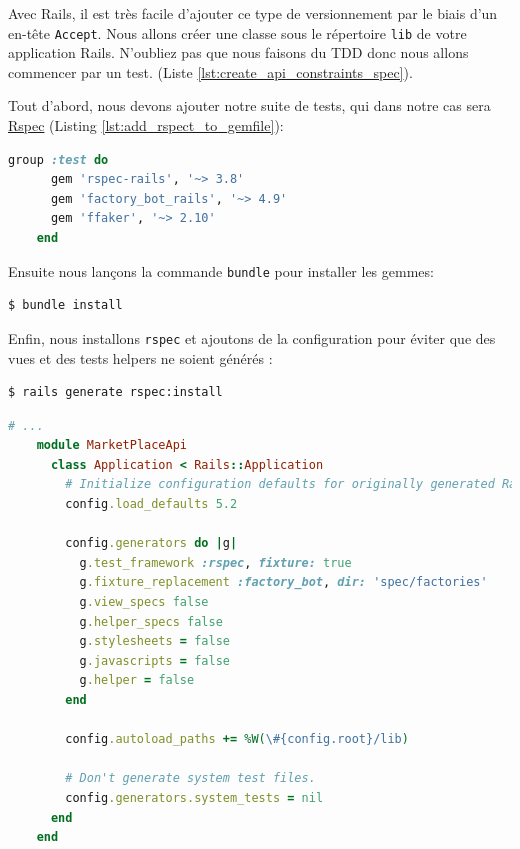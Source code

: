 \documentclass[]{report}
\begin{document}
    Avec Rails, il est très facile d'ajouter ce type de versionnement par le biais d'un en-tête \verb|Accept|. Nous allons créer une classe sous le répertoire \verb|lib| de votre application Rails. N'oubliez pas que nous faisons du TDD donc nous allons commencer par un test. (Liste \ref{lst:create_api_constraints_spec}).

    Tout d'abord, nous devons ajouter notre suite de tests, qui dans notre cas sera \href{http://rspec.info/}{Rspec} (Listing \ref{lst:add_rspect_to_gemfile}):

    \begin{scriptsize}
    \begin{lstlisting}[language=ruby, caption={Gemfile avec la suite de test}, label={lst:add_rspect_to_gemfile}]
    group :test do
      gem 'rspec-rails', '~> 3.8'
      gem 'factory_bot_rails', '~> 4.9'
      gem 'ffaker', '~> 2.10'
    end
    \end{lstlisting}
    \end{scriptsize}

    Ensuite nous lançons la commande \verb|bundle| pour installer les gemmes:

    \begin{scriptsize}
    \begin{lstlisting}[language=bash]
    $ bundle install
    \end{lstlisting}
    \end{scriptsize}

    Enfin, nous installons \verb|rspec| et ajoutons de la configuration pour éviter que des vues et des tests helpers ne soient générés :

    \begin{scriptsize}
    \begin{lstlisting}[language=bash]
    $ rails generate rspec:install
    \end{lstlisting}
    \end{scriptsize}

    \begin{scriptsize}
    \begin{lstlisting}[language=ruby, caption={Configuration de notre suite de test avec respec  (/config/application.rb)}, label={lst:setup_rspec}]
    # ...
    module MarketPlaceApi
      class Application < Rails::Application
        # Initialize configuration defaults for originally generated Rails version.
        config.load_defaults 5.2

        config.generators do |g|
          g.test_framework :rspec, fixture: true
          g.fixture_replacement :factory_bot, dir: 'spec/factories'
          g.view_specs false
          g.helper_specs false
          g.stylesheets = false
          g.javascripts = false
          g.helper = false
        end

        config.autoload_paths += %W(\#{config.root}/lib)

        # Don't generate system test files.
        config.generators.system_tests = nil
      end
    end
    \end{lstlisting}
    \end{scriptsize}
\end{document}
